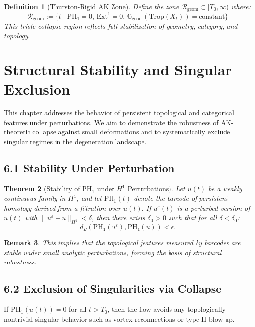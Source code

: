 \documentclass[11pt]{article}
\newtheorem{theorem}{Theorem}[section]
\newtheorem{definition}[theorem]{Definition}
\newtheorem{remark}[theorem]{Remark}
\begin{document}
\begin{definition}[Thurston-Rigid AK Zone]
Define the zone \( \mathcal{R}_\mathrm{geom} \subset [T_0, \infty) \) where:
\[
\mathcal{R}_\mathrm{geom} := \{ t \mid \mathrm{PH}_1 = 0,\, \mathrm{Ext}^1 = 0,\, \mathbb{G}_\mathrm{geom}(\mathrm{Trop}(X_t)) = \text{constant} \}
\]
This triple-collapse region reflects full stabilization of geometry, category, and topology.
\end{definition}


\section{Structural Stability and Singular Exclusion}

This chapter addresses the behavior of persistent topological and categorical features under perturbations. We aim to demonstrate the robustness of AK-theoretic collapse against small deformations and to systematically exclude singular regimes in the degeneration landscape.

\subsection{6.1 Stability Under Perturbation}

\begin{theorem}[Stability of PH$_1$ under $H^1$ Perturbations]
Let $u(t)$ be a weakly continuous family in $H^1$, and let $\mathrm{PH}_1(t)$ denote the barcode of persistent homology derived from a filtration over $u(t)$. If $u^\varepsilon(t)$ is a perturbed version of $u(t)$ with $\|u^\varepsilon - u\|_{H^1} < \delta$, then there exists $\delta_0 > 0$ such that for all $\delta < \delta_0$:
\[
d_B(\mathrm{PH}_1(u^\varepsilon), \mathrm{PH}_1(u)) < \epsilon.
\]
\end{theorem}

\begin{remark}
This implies that the topological features measured by barcodes are stable under small analytic perturbations, forming the basis of structural robustness.
\end{remark}

\subsection{6.2 Exclusion of Singularities via Collapse}

\begin{proposition}
If $\mathrm{PH}_1(u(t)) = 0$ for all $t > T_0$, then the flow avoids any topologically nontrivial singular behavior such as vortex reconnections or type-II blow-up.
\end{proposition}
\end{document}
